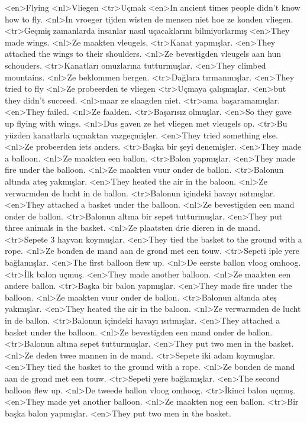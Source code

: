 <en>Flying
<nl>Vliegen
<tr>Uçmak
<en>In ancient times people didn’t know how to fly.
<nl>In vroeger tijden wisten de mensen niet hoe ze konden vliegen.
<tr>Geçmiş zamanlarda insanlar nasıl uçacaklarını bilmiyorlarmış
<en>They made wings.
<nl>Ze maakten vleugels.
<tr>Kanat yapmışlar.
<en>They attached the wings to their shoulders.
<nl>Ze bevestigden vleugels aan hun schouders. 
<tr>Kanatları omuzlarına tutturmuşlar.
<en>They climbed mountains.
<nl>Ze beklommen bergen.
<tr>Dağlara tırmanmışlar.
<en>They tried to fly
<nl>Ze probeerden te vliegen
<tr>Uçmaya çalışmışlar.
<en>but they didn’t succeed.
<nl>maar ze slaagden niet.
<tr>ama başaramamışlar.
<en>They failed.
<nl>Ze faalden.
<tr>Başarısız olmuşlar.
<en>So they gave up flying with wings.
<nl>Dus gaven ze het vliegen met vleugels op.
<tr>Bu yüzden kanatlarla uçmaktan vazgeçmişler.
<en>They tried something else.
<nl>Ze probeerden iets anders.
<tr>Başka bir şeyi denemişler.
<en>They made a balloon.
<nl>Ze maakten een ballon.
<tr>Balon yapmışlar.
<en>They made fire under the balloon.
<nl>Ze maakten vuur onder de ballon.
<tr>Balonun altında ateş yakmışlar.
<en>They heated the air in the baloon.
<nl>Ze verwarmden de lucht in de ballon.
<tr>Balonun içindeki havayı ısıtmışlar.
<en>They attached a basket under the balloon.
<nl>Ze bevestigden een mand onder de ballon.
<tr>Balonun altına bir sepet tutturmuşlar.
<en>They put three animals in the basket.
<nl>Ze plaatsten drie dieren in de mand.
<tr>Sepete 3 hayvan koymuşlar.
<en>They tied the basket to the ground with a rope.
<nl>Ze bonden de mand aan de grond met een touw.
<tr>Sepeti iple yere bağlamışlar.
<en>The first balloon flew up.
<nl>De eerste ballon vloog omhoog.
<tr>İlk balon uçmuş.
<en>They made another balloon.
<nl>Ze maakten een andere ballon.
<tr>Başka bir balon yapmışlar.
<en>They made  fire under the balloon.
<nl>Ze maakten vuur onder de ballon.
<tr>Balonun altında ateş yakmışlar.
<en>They heated the air in the baloon.
<nl>Ze verwarmden de lucht in de ballon.
<tr>Balonun içindeki havayı ısıtmışlar.
<en>They attached a basket under the balloon.
<nl>Ze bevestigden een mand onder de ballon.
<tr>Balonun altına sepet tutturmuşlar.
<en>They put two men in the basket.
<nl>Ze deden twee mannen in de mand.
<tr>Sepete iki adam koymuşlar.
<en>They tied the basket to the ground with a rope.
<nl>Ze bonden de mand aan de grond met een touw.
<tr>Sepeti yere bağlamışlar.
<en>The second balloon flew up.
<nl>De tweede ballon vloog omhoog.
<tr>İkinci balon uçmuş.
<en>They made yet another balloon.
<nl>Ze maakten nog een ballon.
<tr>Bir başka balon yapmışlar.
<en>They put two men in the basket.
